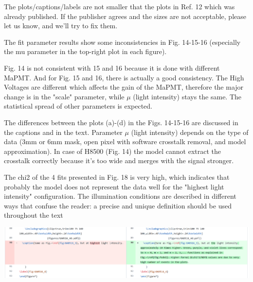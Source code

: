 \documentclass[11pt]{report}
\begin{document}
The plots/captions/labels are not smaller that the plots in Ref. 12 which was already published.
If the publisher agrees and the sizes are not acceptable, please let us know, and we'll try to fix them.


\begin{tcolorbox}[enlarge top by=2em,colbacktitle=blue!60!white,colframe=black!80!white,left=0pt,right=0pt,top=0pt,bottom=0pt,boxrule=0.3pt,title=\bfseries2.07]
The fit parameter results show some inconsistencies in Fig. 14-15-16 (especially the mu parameter in the top-right plot in each figure).
\end{tcolorbox}


Fig. 14 is not consistent with 15 and 16 because it is done with different MaPMT.
And for Fig. 15 and 16, there is actually a good consistency.
The High Voltages are different which affects the gain of the MaPMT, therefore the major change is in the "scale" parameter, while $\mu$ (light intensity) stays the same.
The statistical spread of other parameters is expected.

The differences between the plots (a)-(d) in the Figs. 14-15-16 are discussed in the captions and in the text.
Parameter $\mu$ (light intensity) depends on the type of data (3mm or 6mm mask, open pixel with software crosstalk removal, and model approximation).
In case of H8500 (Fig. 14) the model cannot extract the crosstalk correctly because it's too wide and merges with the signal stronger.



\begin{tcolorbox}[enlarge top by=2em,colbacktitle=black!60!white,colframe=black!80!white,left=0pt,right=0pt,top=0pt,bottom=0pt,boxrule=0.3pt,title=\bfseries2.08]
The chi2 of the 4 fits presented in Fig. 18 is very high, which indicates that probably the model does not represent the data well for the "highest light intensity" configuration. The illumination conditions are described in different ways that confuse the reader: a precise and unique definition should be used throughout the text
\end{tcolorbox}

\includegraphics[width=\linewidth]{round1/2.08.png}
\end{document}
